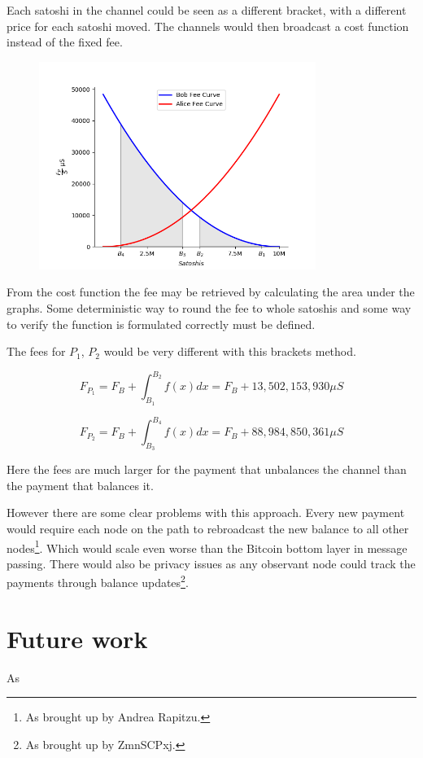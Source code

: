 Each satoshi in the channel could be seen as a different bracket, with a different price for each satoshi moved. The channels would then broadcast a cost function instead of the fixed fee.

\begin{figure}[!htb]
	\hspace*{-0.5cm}
	\centering
	\includegraphics[width=9cm]{images/fee_scheme.png}
	\label{fig:xt_nodes}
	\hspace{2mm}
\end{figure}

From the cost function the fee may be retrieved by calculating the area under the graphs. Some deterministic way to round the fee to whole satoshis and some way to verify the function is formulated correctly must be defined. 

The fees for $P_1$, $P_2$ would be very different with this brackets method.

\[ F_{P_1} = F_{B} + \int_{B_1}^{B_2} f(x) dx = F_B + 13,502,153,930 \mu S \] 

\[ F_{P_2} = F_{B} + \int_{B_3}^{B_4} f(x) dx  = F_B + 88,984,850,361 \mu S \]

Here the fees are much larger for the payment that unbalances the channel than the payment that balances it. 

However there are some clear problems with this approach. Every new payment would require each node on the path to rebroadcast the new balance to all other nodes\footnote{As brought up by Andrea Rapitzu.}. Which would scale even worse than the Bitcoin bottom layer in message passing. There would also be privacy issues as any observant node could track the payments through balance updates\footnote{As brought up by ZmnSCPxj.}.

\section{Future work}

As 